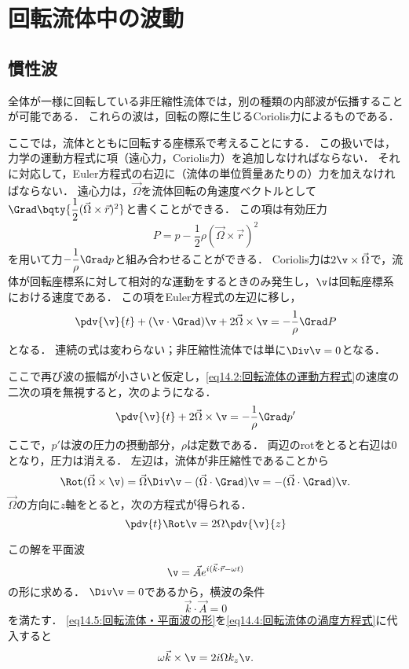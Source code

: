 \section{\spade 回転流体中の波動}
\subsection*{慣性波}
全体が一様に回転している非圧縮性流体では，別の種類の内部波が伝播することが可能である．
これらの波は，回転の際に生じるCoriolis力によるものである．

ここでは，流体とともに回転する座標系で考えることにする．
この扱いでは，力学の運動方程式に項（遠心力，Coriolis力）を追加しなければならない．
それに対応して，Euler方程式の右辺に（流体の単位質量あたりの）力を加えなければならない．
遠心力は，$\vec{\Omega}$を流体回転の角速度ベクトルとして$\Grad \bqty{\dfrac{1}{2}(\vec{\Omega}\times\vec{r})^2}$と書くことができる．
この項は有効圧力
\begin{equation}
    P = p-\frac{1}{2}\rho (\vec{\Omega}\times\vec{r})^2 
\end{equation}
を用いて力$-\dfrac{1}{\rho} \Grad p$と組み合わせることができる．
Coriolis力は$2\v\times\vec{\Omega}$で，流体が回転座標系に対して相対的な運動をするときのみ発生し，$\v$は回転座標系における速度である．
この項をEuler方程式の左辺に移し，
\begin{equation}\label{eq14.2:回転流体の運動方程式}
    \pdv{\v}{t} + (\v\cdot\Grad)\v + 2\vec{\Omega}\times\v = -\frac{1}{\rho} \Grad P
\end{equation}
となる．
連続の式は変わらない；非圧縮性流体では単に$\Div\v=0$となる．

ここで再び波の振幅が小さいと仮定し，\eqref{eq14.2:回転流体の運動方程式}の速度の二次の項を無視すると，次のようになる．
\begin{equation}\label{eq14.3:線形化した，回転流体の運動方程式}
    \pdv{\v}{t} + 2\vec{\Omega}\times\v = -\frac{1}{\rho} \Grad p'
\end{equation}
ここで，$p'$は波の圧力の摂動部分，$\rho$は定数である．
両辺のrotをとると右辺は0となり，圧力は消える．
左辺は，流体が非圧縮性であることから
\[
    \Rot(\vec{\Omega}\times\v) = \vec{\Omega} \Div\v - (\vec{\Omega}\cdot\Grad)\v
    = - (\vec{\Omega}\cdot\Grad)\v .
\]
$\vec{\Omega}$の方向に$z$軸をとると，次の方程式が得られる．
\begin{equation}\label{eq14.4:回転流体の渦度方程式}
    \pdv{t} \Rot\v = 2\Omega \pdv{\v}{z}
\end{equation}  

この解を平面波 
\begin{equation}\label{eq14.5:回転流体・平面波の形}
    \v = \vec{A} e^{i(\vec{k}\cdot\vec{r}-\omega t)}
\end{equation}
の形に求める．
$\Div\v=0$であるから，横波の条件
\begin{equation}
    \vec{k} \cdot \vec{A} = 0
\end{equation}
を満たす．
\eqref{eq14.5:回転流体・平面波の形}を\eqref{eq14.4:回転流体の渦度方程式}に代入すると
\begin{equation}\label{eq14.7:回転流体での途中式}
    \omega \vec{k}\times\v = 2i\Omega k_z \v.
\end{equation}

